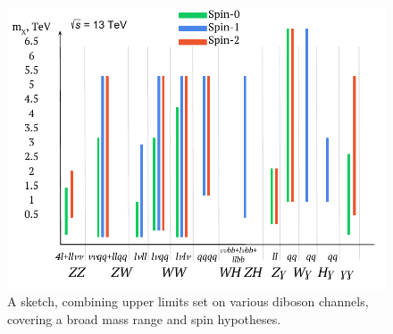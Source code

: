 \documentclass{PoS}
\begin{document}
  \begin{figure}
    \begin{center} 
    \includegraphics[width=.6\textwidth]{figures/lim_sketch}
    \end{center}
\vspace*{-8mm}
     \caption{A sketch, combining upper limits set on various diboson channels, covering a broad mass range and spin hypotheses.}
     \label{fig:summary}
     \end{figure}

\vspace*{-4mm}



%
\end{document}
